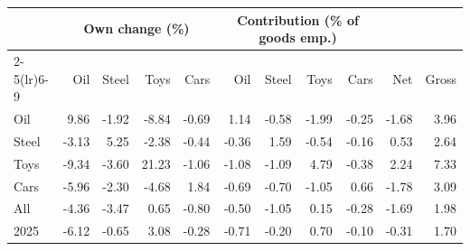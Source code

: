 \begin{tabular}{lrrrrrrrrrr}
\toprule
 & \multicolumn{4}{c}{Own change (\%)} & \multicolumn{4}{c}{Contribution (\% of goods emp.)} & & \\
\cmidrule(lr){2-5}\cmidrule(lr){6-9}
 & Oil & Steel & Toys & Cars & Oil & Steel & Toys & Cars & Net & Gross \\
\midrule
Oil & 9.86 & -1.92 & -8.84 & -0.69 & 1.14 & -0.58 & -1.99 & -0.25 & -1.68 & 3.96 \\
Steel & -3.13 & 5.25 & -2.38 & -0.44 & -0.36 & 1.59 & -0.54 & -0.16 & 0.53 & 2.64 \\
Toys & -9.34 & -3.60 & 21.23 & -1.06 & -1.08 & -1.09 & 4.79 & -0.38 & 2.24 & 7.33 \\
Cars & -5.96 & -2.30 & -4.68 & 1.84 & -0.69 & -0.70 & -1.05 & 0.66 & -1.78 & 3.09 \\
All & -4.36 & -3.47 & 0.65 & -0.80 & -0.50 & -1.05 & 0.15 & -0.28 & -1.69 & 1.98 \\
2025 & -6.12 & -0.65 & 3.08 & -0.28 & -0.71 & -0.20 & 0.70 & -0.10 & -0.31 & 1.70 \\
\bottomrule
\end{tabular}
